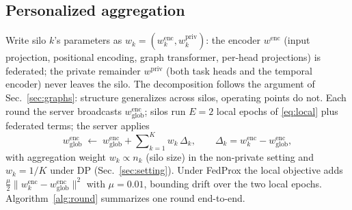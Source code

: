 \documentclass[journal]{IEEEtran}
\begin{document}
\subsection{Personalized aggregation}
\label{sec:agg}
Write silo $k$'s parameters as
$w_k = (w_k^{\mathrm{enc}}, w_k^{\mathrm{priv}})$: the encoder
$w^{\mathrm{enc}}$ (input projection, positional encoding, graph
transformer, per-head projections) is federated; the private remainder
$w^{\mathrm{priv}}$ (both task heads and the temporal encoder) never
leaves the silo. The decomposition follows the argument of
Sec.~\ref{sec:graphs}: structure generalizes across silos, operating
points do not. Each round the server broadcasts
$w^{\mathrm{enc}}_{\mathrm{glob}}$; silos run $E{=}2$ local epochs of
\eqref{eq:local} plus federated terms; the server applies
\begin{equation}
w^{\mathrm{enc}}_{\mathrm{glob}} \;\leftarrow\;
w^{\mathrm{enc}}_{\mathrm{glob}} + \sum\nolimits_{k=1}^{K}
w_k\,\Delta_k,
\qquad
\Delta_k = w_k^{\mathrm{enc}} - w^{\mathrm{enc}}_{\mathrm{glob}},
\label{eq:agg}
\end{equation}
with aggregation weight $w_k \propto n_k$ (silo size) in the
non-private setting and $w_k = 1/K$ under DP (Sec.~\ref{sec:setting}).
Under FedProx the local objective adds
$\tfrac{\mu}{2}\lVert w_k^{\mathrm{enc}} -
w^{\mathrm{enc}}_{\mathrm{glob}} \rVert^{2}$ with $\mu{=}0.01$,
bounding drift over the two local epochs.
Algorithm~\ref{alg:round} summarizes one round end-to-end.
\end{document}

